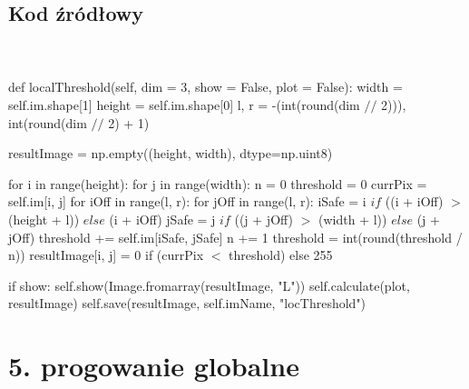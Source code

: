 \documentclass[final,a4paper,openany,12pt]{mwbk}
\begin{document}
\subsection*{Kod źródłowy}
\hfill
\\\\
\noindent def localThreshold(self, dim = 3, show = False, plot = False): \newline
\indent width = self.im.shape[1] \newline
\indent height = self.im.shape[0] \newline
\indent l, r = -(int(round(dim $//$ 2))), int(round(dim $//$ 2) + 1)\newline

resultImage = np.empty((height, width), dtype=np.uint8) \newline

for i in range(height): \newline
\indent for j in range(width): \newline
\indent n = 0 \newline
\indent threshold = 0 \newline
currPix = self.im[i, j] \newline
for iOff in range(l, r): \newline
for jOff in range(l, r): \newline
iSafe = i $if$ ((i + iOff) $>$ (height + l)) $else$ (i + iOff) \newline
jSafe = j $if$ ((j + jOff) $>$ (width + l)) $else$ (j + jOff) \newline
threshold += self.im[iSafe, jSafe] \newline
n += 1 \newline
threshold = int(round(threshold / n)) \newline
resultImage[i, j] = 0 if (currPix $<$ threshold) else 255 \newline

\noindent if show: \newline
self.show(Image.fromarray(resultImage, "L")) \newline
self.calculate(plot, resultImage) \newline
self.save(resultImage, self.imName, "locThreshold") \newline
\newpage
\clearpage




\section*{5. progowanie globalne}
\end{document}
